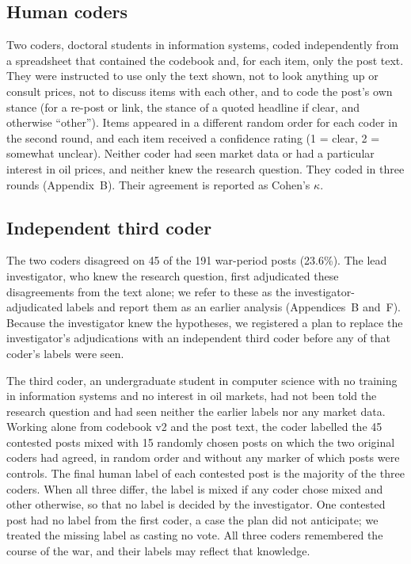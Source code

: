 \documentclass[11pt]{article}
\begin{document}
\subsection{Human coders}

Two coders, doctoral students in information systems, coded independently from a spreadsheet that contained the codebook and, for each item, only the post text. They were instructed to use only the text shown, not to look anything up or consult prices, not to discuss items with each other, and to code the post's own stance (for a re-post or link, the stance of a quoted headline if clear, and otherwise ``other''). Items appeared in a different random order for each coder in the second round, and each item received a confidence rating (1 = clear, 2 = somewhat unclear). Neither coder had seen market data or had a particular interest in oil prices, and neither knew the research question. They coded in three rounds (Appendix~B). Their agreement is reported as Cohen's \citeyearpar{cohen1960} $\kappa$.

\subsection{Independent third coder}

The two coders disagreed on 45 of the 191 war-period posts (23.6\%). The lead investigator, who knew the research question, first adjudicated these disagreements from the text alone; we refer to these as the investigator-adjudicated labels and report them as an earlier analysis (Appendices~B and~F). Because the investigator knew the hypotheses, we registered a plan to replace the investigator's adjudications with an independent third coder before any of that coder's labels were seen.

The third coder, an undergraduate student in computer science with no training in information systems and no interest in oil markets, had not been told the research question and had seen neither the earlier labels nor any market data. Working alone from codebook v2 and the post text, the coder labelled the 45 contested posts mixed with 15 randomly chosen posts on which the two original coders had agreed, in random order and without any marker of which posts were controls. The final human label of each contested post is the majority of the three coders. When all three differ, the label is mixed if any coder chose mixed and other otherwise, so that no label is decided by the investigator. One contested post had no label from the first coder, a case the plan did not anticipate; we treated the missing label as casting no vote. All three coders remembered the course of the war, and their labels may reflect that knowledge.
\end{document}
